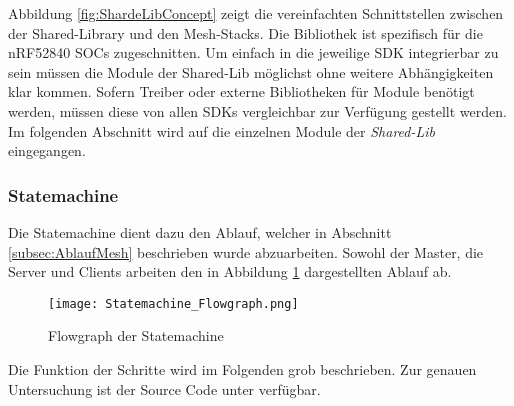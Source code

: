 Abbildung \ref{fig:ShardeLibConcept} zeigt die vereinfachten Schnittstellen zwischen der Shared-Library und den Mesh-Stacks. Die Bibliothek ist spezifisch für die nRF52840 SOCs zugeschnitten. Um einfach in die jeweilige SDK integrierbar zu sein müssen die Module der Shared-Lib möglichst ohne weitere Abhängigkeiten klar kommen. Sofern Treiber oder externe Bibliotheken für Module benötigt werden, müssen diese von allen SDKs vergleichbar zur Verfügung gestellt werden. Im folgenden Abschnitt wird auf die einzelnen Module der \textit{Shared-Lib} eingegangen. 


\subsubsection{Statemachine}\label{subsubsec:StatemachineSoftware}

Die Statemachine dient dazu den Ablauf, welcher in Abschnitt \ref{subsec:AblaufMesh} beschrieben wurde abzuarbeiten. Sowohl der Master, die Server und Clients arbeiten den in Abbildung \ref{fig:StatemachineFLowgraph} dargestellten Ablauf ab. 

\begin{figure}[H]
	\centering
	\texttt{[image: Statemachine\_Flowgraph.png]}
	\caption{Flowgraph der Statemachine}\label{fig:StatemachineFLowgraph}
\end{figure}


Die Funktion der Schritte wird im Folgenden grob beschrieben. Zur genauen Untersuchung ist der Source Code unter \cite{rouben94_sharedlib_software_git_2020} verfügbar.

